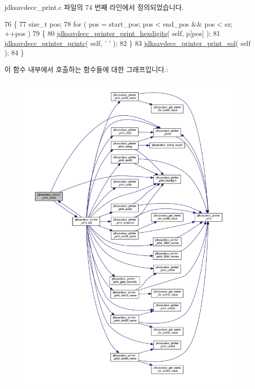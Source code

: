 jdksavdecc\+\_\+print.\+c 파일의 74 번째 라인에서 정의되었습니다.


\begin{DoxyCode}
76 \{
77     \textcolor{keywordtype}{size\_t} pos;
78     \textcolor{keywordflow}{for} ( pos = start\_pos; pos < end\_pos && pos < sz; ++pos )
79     \{
80         \hyperlink{group__util_ga6ee1e417ed3ee0efc12d4ed87e38c405}{jdksavdecc\_printer\_print\_hexdigits}( \textcolor{keyword}{self}, p[pos] );
81         \hyperlink{group__util_ga24b25588730b43333c7b35cecc8f581d}{jdksavdecc\_printer\_printc}( \textcolor{keyword}{self}, \textcolor{charliteral}{' '} );
82     \}
83     \hyperlink{group__util_gacda56c9d3d24593a52c999682fa6e6e3}{jdksavdecc\_printer\_print\_eol}( \textcolor{keyword}{self} );
84 \}
\end{DoxyCode}


이 함수 내부에서 호출하는 함수들에 대한 그래프입니다.\+:
\nopagebreak
\begin{figure}[H]
\begin{center}
\leavevmode
\includegraphics[width=350pt]{group__util_ga18d7b11e396f21996dedde77febcb22f_cgraph}
\end{center}
\end{figure}




